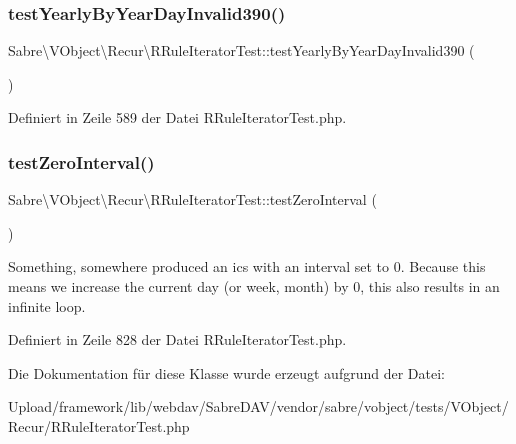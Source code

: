 \subsubsection{\texorpdfstring{test\+Yearly\+By\+Year\+Day\+Invalid390()}{testYearlyByYearDayInvalid390()}}
{\footnotesize\ttfamily Sabre\textbackslash{}\+V\+Object\textbackslash{}\+Recur\textbackslash{}\+R\+Rule\+Iterator\+Test\+::test\+Yearly\+By\+Year\+Day\+Invalid390 (\begin{DoxyParamCaption}{ }\end{DoxyParamCaption})}



Definiert in Zeile 589 der Datei R\+Rule\+Iterator\+Test.\+php.

\mbox{\label{class_sabre_1_1_v_object_1_1_recur_1_1_r_rule_iterator_test_ae39314f02848475094757f0d2d800104}} 
\subsubsection{\texorpdfstring{test\+Zero\+Interval()}{testZeroInterval()}}
{\footnotesize\ttfamily Sabre\textbackslash{}\+V\+Object\textbackslash{}\+Recur\textbackslash{}\+R\+Rule\+Iterator\+Test\+::test\+Zero\+Interval (\begin{DoxyParamCaption}{ }\end{DoxyParamCaption})}

Something, somewhere produced an ics with an interval set to 0. Because this means we increase the current day (or week, month) by 0, this also results in an infinite loop.

Definiert in Zeile 828 der Datei R\+Rule\+Iterator\+Test.\+php.



Die Dokumentation für diese Klasse wurde erzeugt aufgrund der Datei\+:\begin{DoxyCompactItemize}
\item 
Upload/framework/lib/webdav/\+Sabre\+D\+A\+V/vendor/sabre/vobject/tests/\+V\+Object/\+Recur/R\+Rule\+Iterator\+Test.\+php\end{DoxyCompactItemize}
